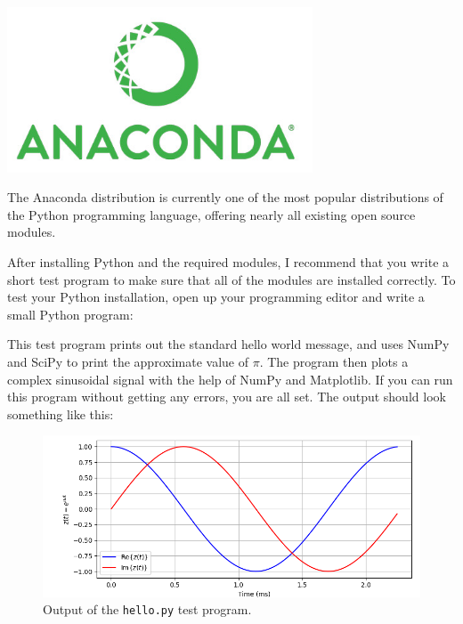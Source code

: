 \begin{marginfigure}[3cm]
\includegraphics[width=0.68\textwidth]{ch02/figures/analogo.jpg}
\caption{The Anaconda distribution is currently one of the most
  popular distributions of the Python programming language, offering
  nearly all existing open source modules.}
\end{marginfigure}

After installing Python and the required modules, I recommend that you
write a short test program to make sure that all of the modules are
installed correctly. To test your Python installation, open up your
programming editor and write a small Python program:

This test program prints out the standard hello world message, and
uses NumPy and SciPy to print the approximate value of $\pi$. The program then
plots a complex sinusoidal signal with the help of NumPy and
Matplotlib.  If you can run this program without getting any errors,
you are all set. The output should look something like this:

\begin{figure}
\includegraphics[width=\textwidth]{ch02/figures/testscreen1.png}
\caption{Output of the \texttt{hello.py} test program.}
\end{figure}

